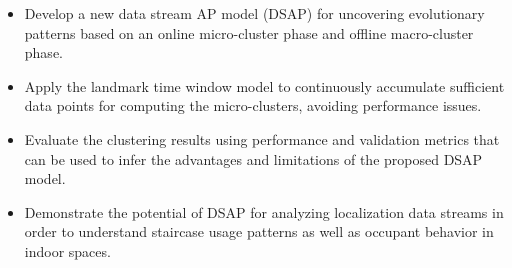 \begin{itemize}

    \item Develop a new data stream AP model (DSAP) for uncovering evolutionary patterns based on an online micro-cluster phase and offline macro-cluster phase.
     \item Apply the landmark time window model to continuously accumulate sufficient data points for computing the micro-clusters, avoiding performance issues.
    \item Evaluate the clustering results using performance and validation metrics that can be used to infer the advantages and limitations of the proposed DSAP model.  
    \item Demonstrate the potential of DSAP for analyzing localization data streams in order to understand staircase usage patterns as well as occupant behavior in indoor spaces.
\end{itemize}  





 




